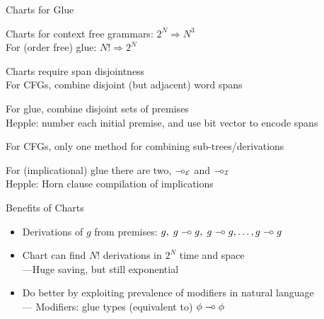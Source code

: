 \begin{hslide}{Charts for Glue}
\begin{items}
\item Charts for context free grammars: $2^N \Rightarrow N^3$\\
      For (order free) glue: $N! \Rightarrow 2^N$\\

\item Charts require span disjointness\\
      For CFGs, combine disjoint (but adjacent) word spans

For glue, combine disjoint sets of premises\\
{\small Hepple: number each initial premise, and use bit vector to encode
spans}

\item For CFGs, only one method for combining sub-trees/derivations

For (implicational) glue there are two, $\mbox{\small$-\hspace*{-.4ex}\circ_{\cal E}$}$ and $\mbox{\small$-\hspace*{-.4ex}\circ_{\cal I}$}$\\
{\small Hepple: Horn clause compilation of implications}
\end{items}
\end{hslide}


\begin{hslide}{Benefits of Charts}

\begin{itemize}
\item Derivations of $g$ from premises: 
{\small $g, \; g\;\mbox{$-\hspace*{-.4ex}\circ$}\; g, \; g\;\mbox{$-\hspace*{-.4ex}\circ$}\; g, \ldots , g\;\mbox{$-\hspace*{-.4ex}\circ$}\; g$} 

\item Chart can find $N!$ derivations in $2^N$ time and space\\
{\small\hspace*{1em}---Huge saving, but still exponential}

\item Do better by exploiting prevalence of modifiers in natural language\\
{\small\hspace*{1em}--- Modifiers: glue types (equivalent to) $\phi\;\mbox{$-\hspace*{-.4ex}\circ$}\;\phi$}
\end{itemize}
\end{hslide}



